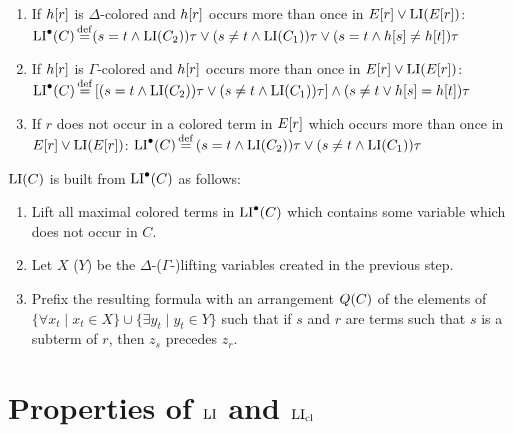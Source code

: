 \documentclass[,%
	draft=false,%
	numbers=noendperiod
	11pt,
	a4paper,
	oneside,%
	openany,
]{memoir}
\begin{document}
\begin{defi}
\begin{itemize}
			\begin{enumerate}

				\item If $h[r]$ is $\Delta$-colored and $h[r]$ occurs more than once in $E[r] \lor \operatorname{LI}(E[r])$:
					\newline
					$\operatorname{LI}^\bullet(C) \operatorname{\stackrel{\mathrm{def}}{=}}  ( s=t \land \operatorname{LI}(C_2) )\tau \lor (s\neq t \land \operatorname{LI}(C_1))\tau \lor (s=t \land h[s] \neq      h[t])\tau$

				\item If $h[r]$ is $\Gamma$-colored and $h[r]$ occurs more than once in $E[r] \lor \operatorname{LI}(E[r])$:
					\newline
					$\operatorname{LI}^\bullet(C)\operatorname{\stackrel{\mathrm{def}}{=}}{} [ ( s=t \land \operatorname{LI}(C_2) )\tau \lor (s\neq t \land \operatorname{LI}(C_1))\tau ] \land\allowbreak (s\neq t \lor h[s] = h[t])\tau$

				\item If $r$ does not occur in a colored term in $E[r]$ which occurs more than once in $E[r] \lor \operatorname{LI}(E[r])$:
					\newline
					$\operatorname{LI}^\bullet(C) \operatorname{\stackrel{\mathrm{def}}{=}}{} ( s=t \land \operatorname{LI}(C_2) )\tau \lor (s\neq t \land \operatorname{LI}(C_1))\tau $ 

			\end{enumerate}

	\end{itemize}

	$\operatorname{LI}(C)$ is built from $\operatorname{LI}^\bullet(C)$ as follows:

	\begin{enumerate}
		\item Lift all maximal colored terms in $\operatorname{LI}^\bullet(C)$ which contains some variable which does not occur in $C$.
		\item Let $X$ ($Y$) be the $\Delta$-($\Gamma$-)lifting variables created in the previous step.
		\item Prefix the resulting formula with an arrangement $Q(C)$ of the elements of $\{\forall x_t \mid x_t \in X\}\cup\allowbreak\{\exists y_t \mid y_t \in Y\}$ such that if $s$ and $r$ are terms such that $s$ is a subterm of $r$, then $z_s$ precedes $z_r$.
			\qedhere
	\end{enumerate}
\end{defi}

\section{Properties of $\operatorname{LI}$ and $\operatorname{LI}_{\operatorname{cl}}$}
\end{document}
